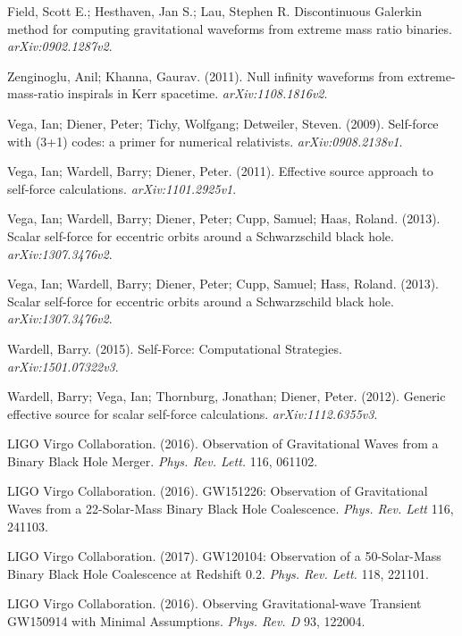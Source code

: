Field, Scott E.; Hesthaven, Jan S.; Lau, Stephen R. Discontinuous Galerkin method for computing gravitational waveforms from extreme mass ratio binaries. {\em arXiv:0902.1287v2}.

Zenginoglu, Anil; Khanna, Gaurav. (2011). Null infinity waveforms from extreme-mass-ratio inspirals in Kerr spacetime. {\em arXiv:1108.1816v2}.

Vega, Ian; Diener, Peter; Tichy, Wolfgang; Detweiler, Steven. (2009). Self-force with (3+1) codes: a primer for numerical relativists. {\em arXiv:0908.2138v1}.

Vega, Ian; Wardell, Barry; Diener, Peter. (2011). Effective source approach to self-force calculations. {\em arXiv:1101.2925v1}.

Vega, Ian; Wardell, Barry; Diener, Peter; Cupp, Samuel; Haas, Roland. (2013). Scalar self-force for eccentric orbits around a Schwarzschild black hole. {\em arXiv:1307.3476v2}.

Vega, Ian; Wardell, Barry; Diener, Peter; Cupp, Samuel; Hass, Roland. (2013). Scalar self-force for eccentric orbits around a Schwarzschild black hole. {\em arXiv:1307.3476v2}.

Wardell, Barry. (2015). Self-Force: Computational Strategies. {\em arXiv:1501.07322v3}.

Wardell, Barry; Vega, Ian; Thornburg, Jonathan; Diener, Peter. (2012). Generic effective source for scalar self-force calculations. {\em arXiv:1112.6355v3}.



LIGO Virgo Collaboration. (2016). Observation of Gravitational Waves from a Binary Black Hole Merger. {\em Phys. Rev. Lett.} 116, 061102.

LIGO Virgo Collaboration. (2016). GW151226: Observation of Gravitational Waves from a 22-Solar-Mass Binary Black Hole Coalescence. {\em Phys. Rev. Lett} 116, 241103.
  
  LIGO Virgo Collaboration. (2017). GW120104: Observation of a 50-Solar-Mass Binary Black Hole Coalescence at Redshift 0.2. {\em Phys. Rev. Lett.} 118, 221101.

  LIGO Virgo Collaboration. (2016). Observing Gravitational-wave Transient GW150914 with Minimal Assumptions. {\em Phys. Rev. D} 93, 122004.


